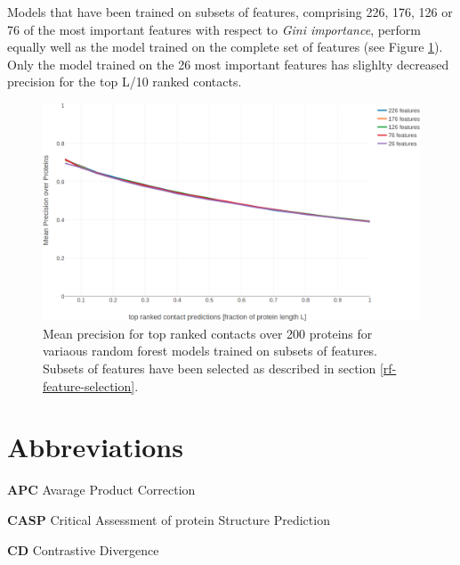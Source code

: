 \documentclass[12pt,a4paper,twoside]{book}
\theoremstyle{definition}
\theoremstyle{definition}
\theoremstyle{remark}
\begin{document}
Models that have been trained on subsets of features, comprising 226,
176, 126 or 76 of the most important features with respect to \emph{Gini
importance}, perform equally well as the model trained on the complete
set of features (see Figure
\ref{fig:feature-selection-rf-with-pll-score}). Only the model trained
on the 26 most important features has slighlty decreased precision for
the top L/10 ranked contacts.






\begin{figure}

{\centering \includegraphics[width=1\linewidth]{img/random_forest_contact_prior/pll_feature/precision_vs_rank_featureselection_random_forest_nestimators1000_maxfeatures03_maxdepth100_minsamplesleaf10_pLLfeature} 

}

\caption{Mean precision for top
ranked contacts over 200 proteins for variaous random forest models
trained on subsets of features. Subsets of features have been selected
as described in section \ref{rf-feature-selection}.}\label{fig:feature-selection-rf-with-pll-score}
\end{figure}

\appendix


\hypertarget{abbrev}{\chapter{Abbreviations}\label{abbrev}}

\textbf{APC} Avarage Product Correction

\textbf{CASP} Critical Assessment of protein Structure Prediction

\textbf{CD} Contrastive Divergence
\end{document}
